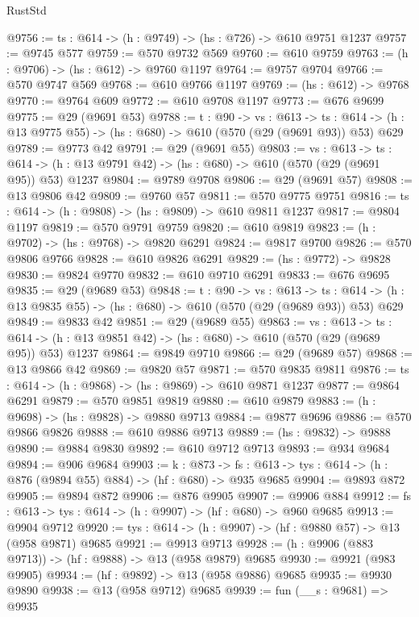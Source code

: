 \begin{lexlean}{RustStd}
\begin{coremodule}
@9756 := {ts : @614} -> (h : @9749) -> (hs : @726) -> @610 @9751 @1237
@9757 := @9745 @577
@9759 := @570 @9732 @569
@9760 := @610 @9759
@9763 := (h : @9706) -> (hs : @612) -> @9760 @1197
@9764 := @9757 @9704
@9766 := @570 @9747 @569
@9768 := @610 @9766 @1197
@9769 := (hs : @612) -> @9768
@9770 := @9764 @609
@9772 := @610 @9708 @1197
@9773 := @676 @9699
@9775 := @29 (@9691 @53)
@9788 := {t : @90} ->
  {vs : @613} ->
  {ts : @614} -> (h : @13 @9775 @55) -> (hs : @680) -> @610 (@570 (@29 (@9691 @93)) @53) @629
@9789 := @9773 @42
@9791 := @29 (@9691 @55)
@9803 := {vs : @613} ->
  {ts : @614} -> (h : @13 @9791 @42) -> (hs : @680) -> @610 (@570 (@29 (@9691 @95)) @53) @1237
@9804 := @9789 @9708
@9806 := @29 (@9691 @57)
@9808 := @13 @9806 @42
@9809 := @9760 @57
@9811 := @570 @9775 @9751
@9816 := {ts : @614} -> (h : @9808) -> (hs : @9809) -> @610 @9811 @1237
@9817 := @9804 @1197
@9819 := @570 @9791 @9759
@9820 := @610 @9819
@9823 := (h : @9702) -> (hs : @9768) -> @9820 @6291
@9824 := @9817 @9700
@9826 := @570 @9806 @9766
@9828 := @610 @9826 @6291
@9829 := (hs : @9772) -> @9828
@9830 := @9824 @9770
@9832 := @610 @9710 @6291
@9833 := @676 @9695
@9835 := @29 (@9689 @53)
@9848 := {t : @90} ->
  {vs : @613} ->
  {ts : @614} -> (h : @13 @9835 @55) -> (hs : @680) -> @610 (@570 (@29 (@9689 @93)) @53) @629
@9849 := @9833 @42
@9851 := @29 (@9689 @55)
@9863 := {vs : @613} ->
  {ts : @614} -> (h : @13 @9851 @42) -> (hs : @680) -> @610 (@570 (@29 (@9689 @95)) @53) @1237
@9864 := @9849 @9710
@9866 := @29 (@9689 @57)
@9868 := @13 @9866 @42
@9869 := @9820 @57
@9871 := @570 @9835 @9811
@9876 := {ts : @614} -> (h : @9868) -> (hs : @9869) -> @610 @9871 @1237
@9877 := @9864 @6291
@9879 := @570 @9851 @9819
@9880 := @610 @9879
@9883 := (h : @9698) -> (hs : @9828) -> @9880 @9713
@9884 := @9877 @9696
@9886 := @570 @9866 @9826
@9888 := @610 @9886 @9713
@9889 := (hs : @9832) -> @9888
@9890 := @9884 @9830
@9892 := @610 @9712 @9713
@9893 := @934 @9684
@9894 := @906 @9684
@9903 := {k : @873} ->
  {fs : @613} -> {tys : @614} -> (h : @876 (@9894 @55) @884) -> (hf : @680) -> @935 @9685
@9904 := @9893 @872
@9905 := @9894 @872
@9906 := @876 @9905
@9907 := @9906 @884
@9912 := {fs : @613} -> {tys : @614} -> (h : @9907) -> (hf : @680) -> @960 @9685
@9913 := @9904 @9712
@9920 := {tys : @614} -> (h : @9907) -> (hf : @9880 @57) -> @13 (@958 @9871) @9685
@9921 := @9913 @9713
@9928 := (h : @9906 (@883 @9713)) -> (hf : @9888) -> @13 (@958 @9879) @9685
@9930 := @9921 (@983 @9905)
@9934 := (hf : @9892) -> @13 (@958 @9886) @9685
@9935 := @9930 @9890
@9938 := @13 (@958 @9712) @9685
@9939 := fun (__s : @9681) => @9935

\end{coremodule}
\end{lexlean}
